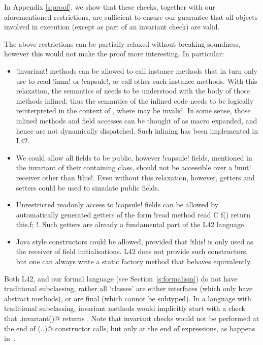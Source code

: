 \noindent In Appendix \ref{s:proof}, we show that these checks, together with our aforementioned restrictions, are sufficient to ensure our guarantee that all objects involved in execution (except as part of an invariant check) are valid.

The above restrictions can be partially relaxed without breaking soundness, however this would not make the proof more interesting. In particular:
\begin{itemize}
	\item \Q!invariant! methods can be allowed to call instance methods that in turn only use \Q@this@ to read \Q!imm! or \Q!capsule!, or call other such instance methods. With this relaxation, the semantics of \Q@invariant@ needs to be understood with the body of those methods inlined; thus the semantics of the inlined code needs to be logically reinterpreted in the context of \Q@invariant@, where \Q@this@ may be invalid. In some sense, those inlined methods and field accesses can be thought of as macro expanded, and hence are not dynamically dispatched. Such inlining has been implemented in L42.
	\item We could allow all fields to be public, however \Q!capsule! fields, mentioned in the invariant of their containing class, should not be accessible over a \Q!mut! receiver other than \Q!this!. Even without this relaxation, however, getters and setters could be used to simulate public fields.
	\item Unrestricted readonly access to \Q!capsule! fields can be allowed by automatically generated getters of the form \Q!read method read C f() { return this.f; }!. Such getters are already a fundamental part of the L42 language.
	
	\item Java style constructors could be allowed, provided that \Q!this! is only used as the receiver of field initialisations. L42 does not provide such constructors, but one can always write a static factory method that behaves equivalently.
\end{itemize}
Both L42, and our formal language (see Section~\ref{s:formalism}) do not have traditional subclassing, rather all `classes' are either interfaces (which only have abstract methods), or are final (which cannot be subtyped). In a language with traditional subclassing, invariant methods would implicitly start with a check that \Q@super.invariant()@ returns \Q@true@. Note that invariant checks would not be performed at the end of \Q@super(..)@ constructor calls, but only at the end of \Q@new@ expressions, as happens in~\cite{feldman2006jose}.

